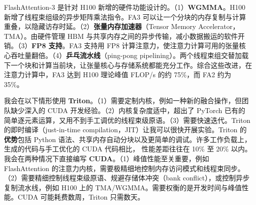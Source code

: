 \begin{interview}

FlashAttention-3 是针对 H100 新增的硬件功能设计的。（1）\textbf{WGMMA}。H100 新增了线程束组级的异步矩阵乘法指令。FA3 可以让一个分块的内存复制与计算重叠，以隐藏访存时延。（2）\textbf{张量内存加速器}（Tensor Memory Accelerator，TMA）。由硬件管理 HBM 与共享内存之间的异步传输，减小数据搬运的软件开销。（3）\textbf{FP8 支持}。FA3 支持用 FP8 计算注意力，使注意力计算可用的张量核心吞吐量翻倍。（4）\textbf{乒乓流水线}（ping-pong pipelining）。两个线程束组交替加载下一个块和计算当前块，让张量核心与存储系统都能充分工作。综合这些改进，在注意力计算中，FA3 达到 H100 理论峰值 FLOP/s 的约 75\%，而 FA2 约为 35\%。


我会在以下情形使用 \textbf{Triton}。（1）需要定制内核，例如一种新的融合操作，但团队缺少深入的 CUDA 开发经验。（2）内核复杂度适中，超出了 PyTorch 已有的简单逐元素运算，又用不到手工调优的线程束级原语。（3）需要快速迭代。Triton 的即时编译（just-in-time compilation，JIT）让我可以很快开展实验。Triton 的\textbf{优势}包括 Python 语法、共享内存自动分块以及更简单的调试。许多工作负载上，生成的代码与手工优化的 CUDA 代码相比，
性能差距往往在 10\% 至 20\% 以内。我会在两种情况下直接编写 \textbf{CUDA}。（1）峰值性能至关重要，例如 FlashAttention 的注意力内核，需要极精细地控制内存访问模式和线程束同步。（2）需要精细控制线程束级原语、规避存储体冲突（bank conflict），或控制异步复制流水线，例如 H100 上的 TMA/WGMMA。需要权衡的是开发时间与峰值性能。CUDA 可能耗费数周，Triton 只需数天。
\end{interview}
